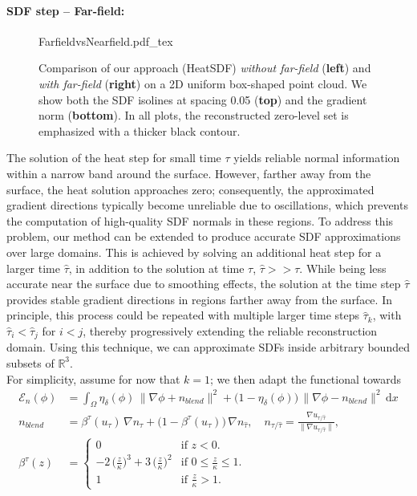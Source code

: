 \documentclass[12pt,openany]{book}
\newcommand{\R}{\mathbb{R}}
\theoremstyle{plainnormal}
\theoremstyle{remark}
\begin{document}
\paragraph{SDF step -- Far-field:}
\begin{figure}
    \centering
    \begingroup
    \sffamily  %
    \def\svgwidth{\textwidth}
    {FarfieldvsNearfield.pdf_tex}
    \endgroup
    \caption{Comparison of our approach (HeatSDF) \emph{without far-field} (\textbf{left}) and \emph{with far-field} (\textbf{right}) on a 2D uniform box-shaped point cloud. We show both the SDF isolines at spacing 0.05 (\textbf{top}) and the gradient norm (\textbf{bottom}). In all plots, the reconstructed zero-level set is emphasized with a thicker black contour.}\label{farfield_comp}
\end{figure}
The solution of the heat step for small time $\tau$ yields reliable normal information within a narrow band around the surface. However, farther away from the surface, the heat solution approaches zero; consequently, the approximated gradient directions typically become unreliable due to oscillations, which prevents the computation of high-quality SDF normals in these regions. To address this problem, our method can be extended to produce accurate SDF approximations over large domains. This is achieved by solving an additional heat step for a larger time $\hat{\tau}$, in addition to the solution at time $\tau$, $\hat \tau >> \tau$. While being less accurate near the surface due to smoothing effects, the solution at the time step $\hat \tau$ provides stable gradient directions in regions farther away from the surface. In principle, this process could be repeated with multiple larger time steps $\hat{\tau}_k$, with $\hat{\tau}_i < \hat{\tau}_j$ for $i < j$, thereby progressively extending the reliable reconstruction domain. Using this technique, we can approximate SDFs inside arbitrary bounded subsets of $\R^3$.\\
For simplicity, assume for now that $k = 1$; we then adapt the functional towards 
\begin{align*}
    \mathcal{E}_n (\phi)&= \int_\Omega \eta_\delta(\phi)\, \|\nabla \phi + n_{blend}\|^2 + \big(1 - \eta_\delta(\phi)\big)\,\|\nabla \phi - n_{blend}\|^2 \,\mathrm{d}x\\  n_{blend} &= \beta^\tau(u_\tau)\, \nabla n_\tau + \big(1-\beta^\tau(u_\tau)\big)\,\nabla n_{\hat \tau}, \quad n_{\tau/ \hat \tau} = \frac{\nabla u_{\tau/ \hat \tau}}{\|\nabla u_{\tau/ \hat \tau}\|}, \\\beta^\tau(z) &= \begin{cases}
0 & \text{if } z < 0. \\
-2\,\big(\frac{z}{\kappa}\big)^3 + 3\, \big(\frac{z}{\kappa}\big)^2 & \text{if } 0 \leq \frac{z}{\kappa} \leq 1. \\
1 & \text{if } \frac{z}{\kappa} > 1.
\end{cases}
\end{align*} 
\end{document}
